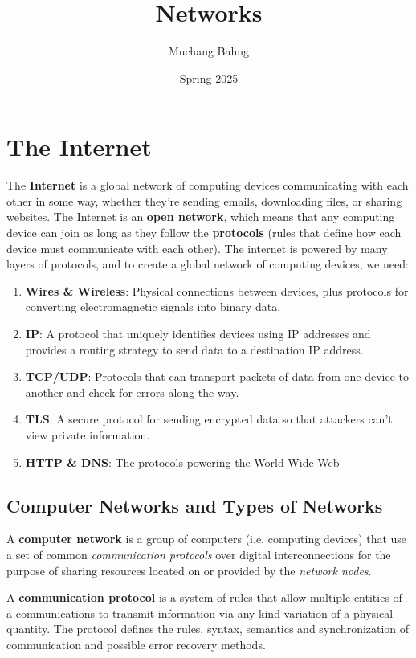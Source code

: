 \documentclass{article}
\begin{document}
\title{Networks}
\author{Muchang Bahng}
\date{Spring 2025}

\maketitle
\tableofcontents
\pagebreak

\section{The Internet}

  The \textbf{Internet} is a global network of computing devices communicating with each other in some way, whether they're sending emails, downloading files, or sharing websites. The Internet is an \textbf{open network}, which means that any computing device can join as long as they follow the \textbf{protocols} (rules that define how each device must communicate with each other). The internet is powered by many layers of protocols, and to create a global network of computing devices, we need: 
  \begin{enumerate}
      \item \textbf{Wires \& Wireless}: Physical connections between devices, plus protocols for converting electromagnetic signals into binary data. 
      \item \textbf{IP}: A protocol that uniquely identifies devices using IP addresses and provides a routing strategy to send data to a destination IP address. 
      \item \textbf{TCP/UDP}: Protocols that can transport packets of data from one device to another and check for errors along the way. 
      \item \textbf{TLS}: A secure protocol for sending encrypted data so that attackers can't view private information. 
      \item \textbf{HTTP \& DNS}: The protocols powering the World Wide Web
  \end{enumerate}

  \subsection{Computer Networks and Types of Networks}

  \begin{definition}
  A \textbf{computer network} is a group of computers (i.e. computing devices) that use a set of common \textit{communication protocols} over digital interconnections for the purpose of sharing resources located on or provided by the \textit{network nodes}. 

  A \textbf{communication protocol} is a system of rules that allow multiple entities of a communications to transmit information via any kind variation of a physical quantity. The protocol defines the rules, syntax, semantics and synchronization of communication and possible error recovery methods. 
  \end{definition}
\end{document}
